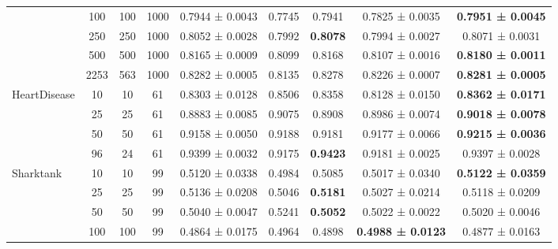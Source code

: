 \begin{table}
{\begin{tabular}[H]{@{}lcccccccc@{}}
                              & 100   & 100  & 1000 & 0.7944 ± 0.0043      & 0.7745               & 0.7941          & 0.7825 ± 0.0035          & \textbf{0.7951 ± 0.0045} \\
                              & 250   & 250  & 1000 & 0.8052 ± 0.0028      & 0.7992               & \textbf{0.8078} & 0.7994 ± 0.0027          & 0.8071 ± 0.0031          \\
                              & 500   & 500  & 1000 & 0.8165 ± 0.0009      & 0.8099               & 0.8168          & 0.8107 ± 0.0016          & \textbf{0.8180 ± 0.0011} \\
                              & 2253  & 563  & 1000 & 0.8282 ± 0.0005      & 0.8135               & 0.8278          & 0.8226 ± 0.0007          & \textbf{0.8281 ± 0.0005} \\
                              \midrule
\multirow{4}{*}{HeartDisease} & 10    & 10   & 61   & 0.8303 ± 0.0128      & 0.8506               & 0.8358          & 0.8128 ± 0.0150          & \textbf{0.8362 ± 0.0171} \\
                              & 25    & 25   & 61   & 0.8883 ± 0.0085      & 0.9075               & 0.8908          & 0.8986 ± 0.0074          & \textbf{0.9018 ± 0.0078} \\
                              & 50    & 50   & 61   & 0.9158 ± 0.0050      & 0.9188               & 0.9181          & 0.9177 ± 0.0066          & \textbf{0.9215 ± 0.0036} \\
                              & 96    & 24   & 61   & 0.9399 ± 0.0032      & 0.9175               & \textbf{0.9423} & 0.9181 ± 0.0025          & 0.9397 ± 0.0028          \\
                              \midrule
\multirow{5}{*}{Sharktank}    & 10    & 10   & 99   & 0.5120 ± 0.0338      & 0.4984               & 0.5085          & 0.5017 ± 0.0340          & \textbf{0.5122 ± 0.0359} \\
                              & 25    & 25   & 99   & 0.5136 ± 0.0208      & 0.5046               & \textbf{0.5181} & 0.5027 ± 0.0214          & 0.5118 ± 0.0209          \\
                              & 50    & 50   & 99   & 0.5040 ± 0.0047      & 0.5241               & \textbf{0.5052} & 0.5022 ± 0.0022          & 0.5020 ± 0.0046          \\
                              & 100   & 100  & 99   & 0.4864 ± 0.0175      & 0.4964               & 0.4898          & \textbf{0.4988 ± 0.0123} & 0.4877 ± 0.0163          \\

\end{tabular}}
\end{table}
